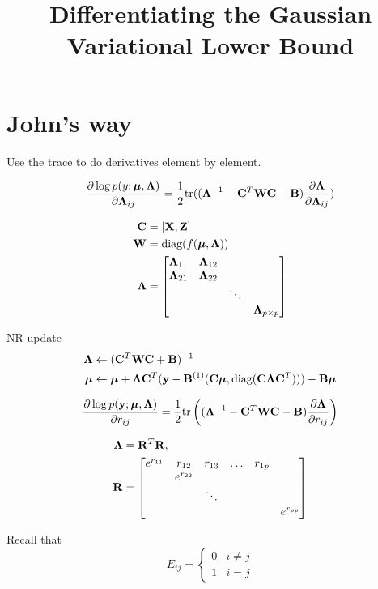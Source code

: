 \documentclass{article}[12pt]
\title{Differentiating the Gaussian Variational Lower Bound}
\begin{document}
\section{John's way}

Use the trace to do derivatives element by element.

\begin{equation*}
\frac{\partial \log p(y;{\boldsymbol \mu}, {\boldsymbol \Lambda})}{\partial {\boldsymbol\Lambda}_{ij}} = {\frac{1}{2}} \text{tr} (({\boldsymbol \Lambda}^{-1} - {\bf C}^T {\bf W} {\bf C} - {\bf B})\frac{\partial {\boldsymbol\Lambda}}{\partial {\boldsymbol\Lambda}_{ij}})
\end{equation*}

\begin{align*}
{\bf C} &= [{\bf X}, {\bf Z}] \\
{\bf W} &= \text{diag}(f({\boldsymbol \mu}, {\boldsymbol \Lambda})) \\
{\boldsymbol \Lambda} &= \begin{bmatrix}
{\boldsymbol\Lambda}_{11} & {\boldsymbol \Lambda}_{12} &  &\\
{\boldsymbol \Lambda}_{21} & {\boldsymbol \Lambda}_{22} &  &\\
& & \ddots & \\
& & & {\boldsymbol \Lambda}_{p \times p}
\end{bmatrix}
\end{align*}

\noindent NR update
\begin{align*}
{\boldsymbol\Lambda} &\leftarrow ({\bf C}^T {\bf W} {\bf C} + {\bf B})^{-1} \\
{\boldsymbol \mu} &\leftarrow {\boldsymbol\mu} + {\boldsymbol \Lambda} {\bf C}^T ({\bf y} - {\bf B}^{(1)}({\bf C}{\boldsymbol \mu}, \text{diag} ({\bf C} {\boldsymbol \Lambda} {\bf C}^T))) - {\bf B} {\boldsymbol \mu}
\end{align*}

$$
\frac{\partial \log p ({\bf y};{\boldsymbol \mu}, {\boldsymbol \Lambda})}{\partial r_{ij}} = {\frac{1}{2}} \text{tr} \left (({\boldsymbol \Lambda}^{-1} - {\bf C}^T {\bf W} {\bf C} - {\bf B}) \frac{\partial {\boldsymbol\Lambda}}{\partial r_{ij}} \right )
$$

\begin{align*}
{\boldsymbol\Lambda} &= {\bf R}^T {\bf R}, \\
{\bf R} &= \begin{bmatrix}
e^{r_{11}} & r_{12} & r_{13} & \dots & r_{1p} \\
& e^{r_{22}} & & & & \\
&  & \ddots & & & \\
&  & & & & e^{r_{pp}}\\
\end{bmatrix}
\end{align*}

\noindent Recall that
$$E_{ij} =
\begin{cases}
0 & i \ne j \\
1 & i = j
\end{cases}
$$
\end{document}
